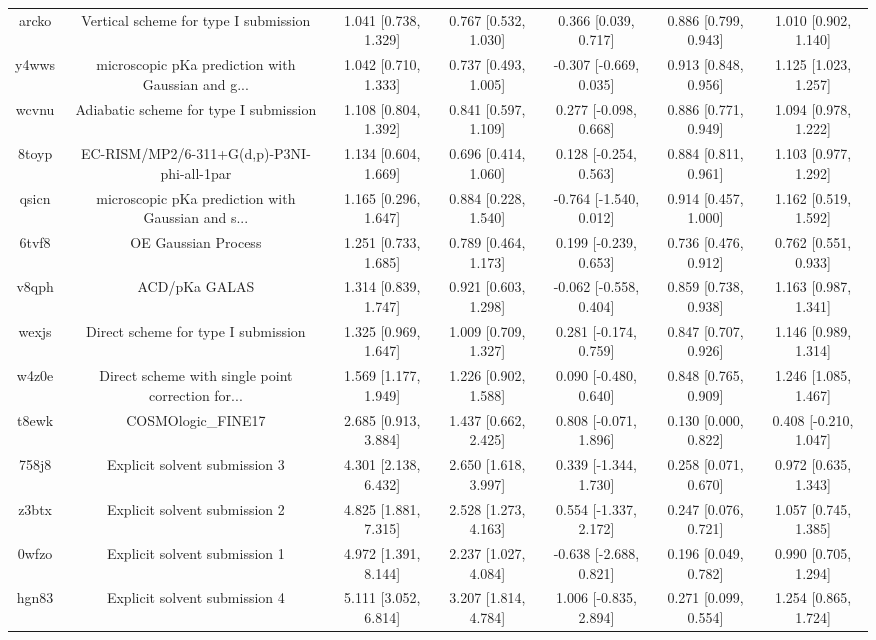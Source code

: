\documentclass{article}
\begin{document}
\begin{center}
\begin{longtable}{|ccccccc|}
 arcko &              Vertical scheme for type I submission &  1.041 [0.738, 1.329] &  0.767 [0.532, 1.030] &     0.366 [0.039, 0.717] &  0.886 [0.799, 0.943] &   1.010 [0.902, 1.140] \\
 y4wws &  microscopic pKa prediction with Gaussian and g... &  1.042 [0.710, 1.333] &  0.737 [0.493, 1.005] &   -0.307 [-0.669, 0.035] &  0.913 [0.848, 0.956] &   1.125 [1.023, 1.257] \\
 wcvnu &             Adiabatic scheme for type I submission &  1.108 [0.804, 1.392] &  0.841 [0.597, 1.109] &    0.277 [-0.098, 0.668] &  0.886 [0.771, 0.949] &   1.094 [0.978, 1.222] \\
 8toyp &         EC-RISM/MP2/6-311+G(d,p)-P3NI-phi-all-1par &  1.134 [0.604, 1.669] &  0.696 [0.414, 1.060] &    0.128 [-0.254, 0.563] &  0.884 [0.811, 0.961] &   1.103 [0.977, 1.292] \\
 qsicn &  microscopic pKa prediction with Gaussian and s... &  1.165 [0.296, 1.647] &  0.884 [0.228, 1.540] &   -0.764 [-1.540, 0.012] &  0.914 [0.457, 1.000] &   1.162 [0.519, 1.592] \\
 6tvf8 &                                OE Gaussian Process &  1.251 [0.733, 1.685] &  0.789 [0.464, 1.173] &    0.199 [-0.239, 0.653] &  0.736 [0.476, 0.912] &   0.762 [0.551, 0.933] \\
 v8qph &                                      ACD/pKa GALAS &  1.314 [0.839, 1.747] &  0.921 [0.603, 1.298] &   -0.062 [-0.558, 0.404] &  0.859 [0.738, 0.938] &   1.163 [0.987, 1.341] \\
 wexjs &                Direct scheme for type I submission &  1.325 [0.969, 1.647] &  1.009 [0.709, 1.327] &    0.281 [-0.174, 0.759] &  0.847 [0.707, 0.926] &   1.146 [0.989, 1.314] \\
 w4z0e &  Direct scheme with single point correction for... &  1.569 [1.177, 1.949] &  1.226 [0.902, 1.588] &    0.090 [-0.480, 0.640] &  0.848 [0.765, 0.909] &   1.246 [1.085, 1.467] \\
 t8ewk &                                 COSMOlogic\_FINE17 &  2.685 [0.913, 3.884] &  1.437 [0.662, 2.425] &    0.808 [-0.071, 1.896] &  0.130 [0.000, 0.822] &  0.408 [-0.210, 1.047] \\
 758j8 &                      Explicit solvent submission 3 &  4.301 [2.138, 6.432] &  2.650 [1.618, 3.997] &    0.339 [-1.344, 1.730] &  0.258 [0.071, 0.670] &   0.972 [0.635, 1.343] \\
 z3btx &                      Explicit solvent submission 2 &  4.825 [1.881, 7.315] &  2.528 [1.273, 4.163] &    0.554 [-1.337, 2.172] &  0.247 [0.076, 0.721] &   1.057 [0.745, 1.385] \\
 0wfzo &                      Explicit solvent submission 1 &  4.972 [1.391, 8.144] &  2.237 [1.027, 4.084] &   -0.638 [-2.688, 0.821] &  0.196 [0.049, 0.782] &   0.990 [0.705, 1.294] \\
 hgn83 &                      Explicit solvent submission 4 &  5.111 [3.052, 6.814] &  3.207 [1.814, 4.784] &    1.006 [-0.835, 2.894] &  0.271 [0.099, 0.554] &   1.254 [0.865, 1.724] \\
\end{longtable}
\end{center}
\end{document}
